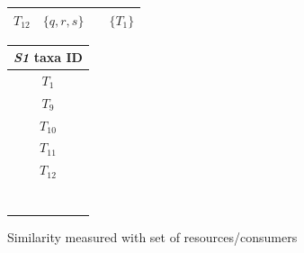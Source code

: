 \documentclass[letterpaper]{article}
\begin{document}
\begin{table}[h!]
\begin{tabular}{cccc}
        $T_{12}$ &      $\{q, r, s\}$ &      &                          $\{T_1\}$         \\
        \hline
      \end{tabular}
      \quad \quad
      \begin{tabular}{c}
          \hline
          \textit{S1} taxa ID \\
          \hline\hline
          $T_1$ \\
          $T_9$ \\
          $T_{10}$ \\
          $T_{11}$ \\
          $T_{12}$ \\
          \hline
          \\  \\  \\  \\  \\  \\  \\
      \end{tabular}
    \end{table}

    \centerline{Similarity measured with set of resources/consumers}
\end{document}
